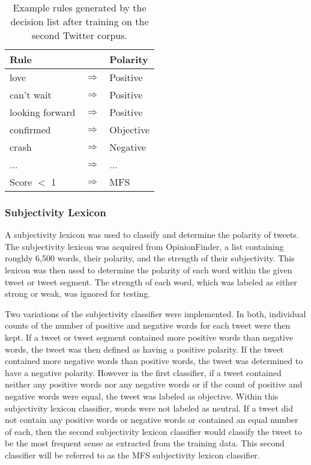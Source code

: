 \documentclass[11pt]{article}
\begin{document}
\begin{table}[H]
  \begin{center}
  \begin{tabular}{| p{3cm} l l |}
  \hline
  Rule & & Polarity \\ \hline
  love & $\Rightarrow$ & Positive \\
  can't wait & $\Rightarrow$ & Positive \\
  looking forward & $\Rightarrow$ & Positive \\
  confirmed & $\Rightarrow$ & Objective \\
  crash & $\Rightarrow$ & Negative \\
  ... & $\Rightarrow$ & ... \\
  Score $<$ 1 & $\Rightarrow$ & MFS \\ \hline
  \end{tabular}
  \end{center}
  \caption{Example rules generated by the decision list after training on the second Twitter corpus.}
\end{table}

\subsubsection*{Subjectivity Lexicon}
A subjectivity lexicon was used to classify and determine the polarity of tweets. The subjectivity lexicon was acquired from OpinionFinder, a list containing roughly 6,500 words, their polarity, and the strength of their subjectivity. This lexicon was then used to determine the polarity of each word within the given tweet or tweet segment. The strength of each word, which was labeled as either strong or weak, was ignored for testing.

\indent Two variations of the subjectivity classifier were implemented. In both, individual counts of the number of positive and negative words for each tweet were then kept. If a tweet or tweet segment contained more positive words than negative words, the tweet was then defined as having a positive polarity. If the tweet contained more negative words than positive words, the tweet was determined to have a negative polarity. However in the first classifier, if a tweet contained neither any positive words nor any negative words or if the count of positive and negative words were equal, the tweet was labeled as objective. Within this subjectivity lexicon classifier, words were not labeled as neutral. If a tweet did not contain any positive words or negative words or contained an equal number of each, then the second subjectivity lexicon classifier would classify the tweet to be the most frequent sense as extracted from the training data. This second classifier will be referred to as the MFS subjectivity lexicon classifier.
\end{document}
